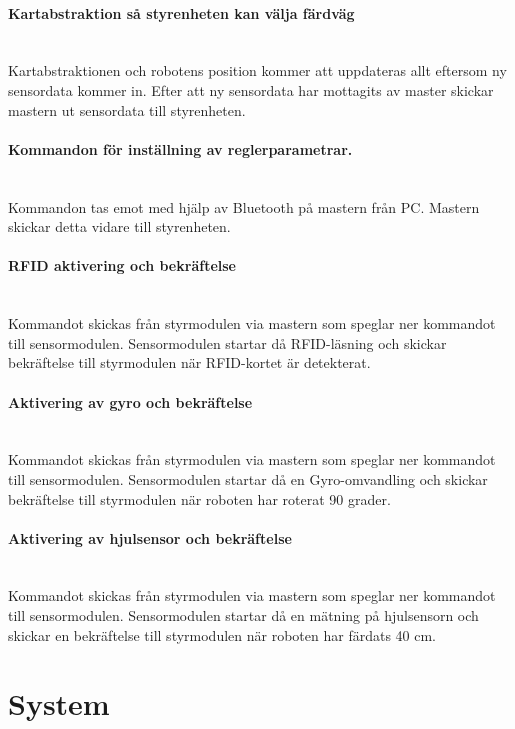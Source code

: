\documentclass[a4paper,12pt,fleqn]{article}
\begin{document}
\paragraph{Kartabstraktion så styrenheten kan välja färdväg}
~\\
Kartabstraktionen och robotens position kommer att uppdateras allt eftersom ny sensordata kommer in. Efter att ny sensordata har mottagits av master skickar mastern ut sensordata till styrenheten.
\paragraph{Kommandon för inställning av reglerparametrar.}
~\\
Kommandon tas emot med hjälp av Bluetooth på mastern från PC. Mastern skickar detta vidare till styrenheten. 
\paragraph{RFID aktivering och bekräftelse}
~\\
Kommandot skickas från styrmodulen via mastern som speglar ner kommandot till sensormodulen. Sensormodulen startar då RFID-läsning och skickar bekräftelse till styrmodulen när RFID-kortet är detekterat.  

\paragraph{Aktivering av gyro och bekräftelse}
~\\
Kommandot skickas från styrmodulen via mastern som speglar ner kommandot till sensormodulen. Sensormodulen startar då en Gyro-omvandling och skickar bekräftelse till styrmodulen när roboten har roterat 90 grader. 

\paragraph{Aktivering av hjulsensor och bekräftelse}
~\\
Kommandot skickas från styrmodulen via mastern som speglar ner kommandot till sensormodulen. Sensormodulen startar då en mätning på hjulsensorn och skickar en bekräftelse till styrmodulen när roboten har färdats 40 cm. 




\newpage
\section{System}
\end{document}
